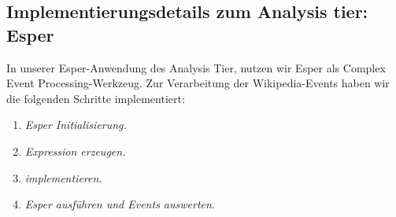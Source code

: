 \subsection{Implementierungsdetails zum Analysis tier: Esper}
In unserer Esper-Anwendung des Analysis Tier, nutzen wir Esper als Complex Event Processing-Werkzeug. Zur Verarbeitung
der Wikipedia-Events haben wir die folgenden Schritte implementiert:
\begin{enumerate}
    \item \textit{Esper Initialisierung.}
    \item \textit{Expression erzeugen.}
    \item \textit{ implementieren.}
    \item \textit{Esper ausführen und Events auswerten.}
\end{enumerate}